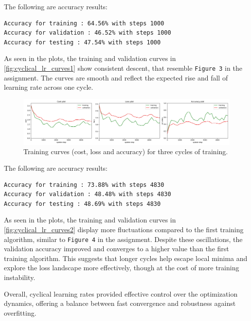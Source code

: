 \documentclass[11pt]{article}
\begin{document}
The following are accuracy results: 
\begin{lstlisting}[caption={Training and validation accuracy for one cycle}, label={lst:accuracy}]
Accuracy for training : 64.56% with steps 1000
Accuracy for validation : 46.52% with steps 1000
Accuracy for testing : 47.54% with steps 1000
\end{lstlisting}

As seen in the plots, the training and validation curves in \autoref{fig:cyclical_lr_curves1} show consistent descent, that resemble \texttt{Figure 3} in the assignment.
The curves are smooth and reflect the expected rise and fall of learning rate across one cycle. 

\begin{figure}[H]
    \centering
    \includegraphics[width=1\textwidth]{cyclic_training_curves_ex4.jpg}
    \caption{Training curves (cost, loss and accuracy) for three cycles of training.}
    \label{fig:cyclical_lr_curves2}
\end{figure}

The following are accuracy results:

\begin{lstlisting}[caption={Training and validation accuracy for three cycles}, label={lst:accuracy2}]
Accuracy for training : 73.88% with steps 4830
Accuracy for validation : 48.48% with steps 4830
Accuracy for testing : 48.69% with steps 4830
\end{lstlisting}

As seen in the plots, the training and validation curves in \autoref{fig:cyclical_lr_curves2} display more fluctuations compared to the first training algorithm, similar to \texttt{Figure 4} in the assignment. 
Despite these oscillations, the validation accuracy improved and converges to a higher value than the first training algorithm.
This suggests that longer cycles help escape local minima and explore the loss landscape more effectively, though at the cost of more training instability.

Overall, cyclical learning rates provided effective control over the optimization dynamics, offering a balance between fast convergence and robustness against overfitting.
\end{document}
